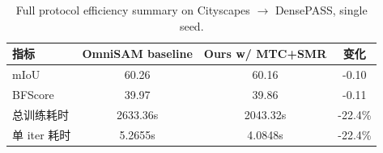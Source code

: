 \begin{table}[t]
  \centering
  \caption{Full protocol efficiency summary on Cityscapes $\rightarrow$ DensePASS, single seed.}
  \label{tab:efficiency_analysis}
  \begin{tabular}{lccc}
    \toprule
    指标 & OmniSAM baseline & Ours w/ MTC+SMR & 变化 \\
    \midrule
    mIoU & 60.26 & 60.16 & -0.10 \\
    BFScore & 39.97 & 39.86 & -0.11 \\
    总训练耗时 & 2633.36s & 2043.32s & -22.4\% \\
    单 iter 耗时 & 5.2655s & 4.0848s & -22.4\% \\
    \bottomrule
  \end{tabular}
\end{table}
